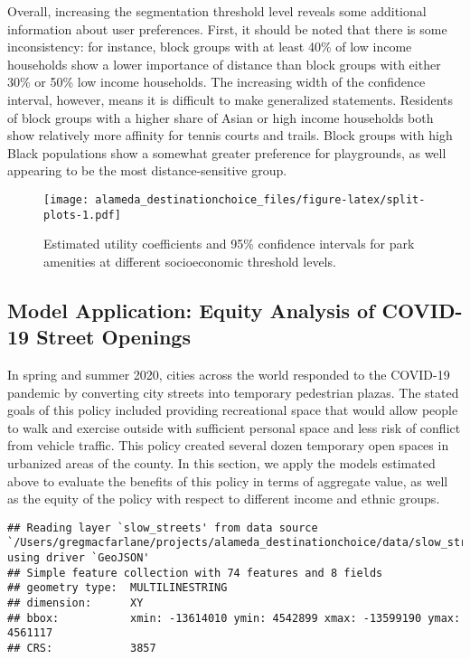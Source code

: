 \documentclass[]{elsarticle} %
\makeatletter
\def\maxwidth{\ifdim\Gin@nat@width>\linewidth\linewidth
\else\Gin@nat@width\fi}
\let\Oldincludegraphics\includegraphics
\renewcommand{\includegraphics}[1]{\Oldincludegraphics[width=\maxwidth]{#1}}
\makeatother
\begin{document}
Overall, increasing the segmentation threshold level reveals some additional
information about user preferences. First, it should be noted that there is
some inconsistency: for instance, block groups with at least 40\% of low income
households show a lower importance of distance than block groups with either
30\% or 50\% low income households. The increasing width of the confidence interval,
however, means it is difficult to make generalized statements. Residents of
block groups with a higher share of Asian or high income households both show
relatively more affinity for tennis courts and trails. Block groups with high
Black populations show a somewhat greater preference for playgrounds, as well
appearing to be the most distance-sensitive group.

\begin{figure}
\centering
\texttt{[image: alameda\_destinationchoice\_files/figure-latex/split-plots-1.pdf]}
\caption{\label{fig:split-plots}Estimated utility coefficients and 95\% confidence intervals for park amenities at different socioeconomic threshold levels.}
\end{figure}

\hypertarget{model-application-equity-analysis-of-covid-19-street-openings}{%
\subsection{Model Application: Equity Analysis of COVID-19 Street Openings}\label{model-application-equity-analysis-of-covid-19-street-openings}}

In spring and summer 2020, cities across the world responded to the COVID-19
pandemic by converting city streets into temporary pedestrian plazas. The stated
goals of this policy included providing recreational space that would allow
people to walk and exercise outside with sufficient personal space and less risk
of conflict from vehicle traffic. This policy created several dozen temporary
open spaces in urbanized areas of the county. In this section, we apply the
models estimated above to evaluate the benefits of this policy in terms of
aggregate value, as well as the equity of the policy with respect to different
income and ethnic groups.

\begin{verbatim}
## Reading layer `slow_streets' from data source `/Users/gregmacfarlane/projects/alameda_destinationchoice/data/slow_streets.geojson' using driver `GeoJSON'
## Simple feature collection with 74 features and 8 fields
## geometry type:  MULTILINESTRING
## dimension:      XY
## bbox:           xmin: -13614010 ymin: 4542899 xmax: -13599190 ymax: 4561117
## CRS:            3857
\end{verbatim}
\end{document}
